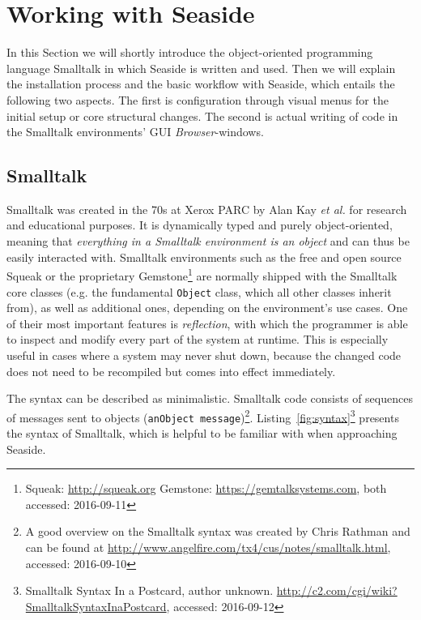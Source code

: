 \documentclass[a4paper,12pt,pagesize,headsepline,titlepage]{scrartcl}
\begin{document}
\section{Working with Seaside}
\label{sec:workflow}

In this Section we will shortly introduce the object-oriented programming language Smalltalk in which Seaside is written and used. Then we will explain the installation process and the basic workflow with Seaside, which entails the following two aspects. The first is configuration through visual menus for the initial setup or core structural changes. The second is actual writing of code in the Smalltalk environments' GUI \emph{Browser}-windows\cite{perscheid2008introduction}.


\subsection{Smalltalk}

Smalltalk was created in the 70s at Xerox PARC by Alan Kay \emph{et al.} for research and educational purposes. It is dynamically typed and purely object-oriented, meaning that \emph{everything in a Smalltalk environment is an object} and can thus be easily interacted with. Smalltalk environments such as the free and open source Squeak or the proprietary Gemstone\footnote{Squeak: \url{http://squeak.org} Gemstone: \url{https://gemtalksystems.com}, both accessed: 2016-09-11} are normally shipped with the Smalltalk core classes (e.g. the fundamental \texttt{Object} class, which all other classes inherit from), as well as additional ones, depending on the environment's use cases. One of their most important features is \emph{reflection}, with which the programmer is able to inspect and modify every part of the system at runtime. This is especially useful in cases where a system may never shut down, because the changed code does not need to be recompiled but comes into effect immediately. 

The syntax can be described as minimalistic. Smalltalk code consists of sequences of messages sent to objects (\texttt{anObject message})\footnote{A good overview on the Smalltalk syntax was created by Chris Rathman and can be found at \url{http://www.angelfire.com/tx4/cus/notes/smalltalk.html}, accessed: 2016-09-10}. Listing~\ref{fig:syntax}\footnote{Smalltalk Syntax In a Postcard, author unknown. \url{http://c2.com/cgi/wiki?SmalltalkSyntaxInaPostcard}, accessed: 2016-09-12} presents the syntax of Smalltalk, which is helpful to be familiar with when approaching Seaside.  
\end{document}
